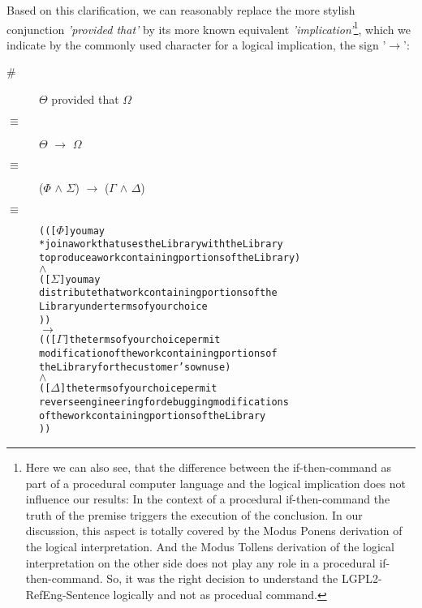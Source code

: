Based on this clarification, we can reasonably replace the more stylish
conjunction \emph{'provided that'} by its more known equivalent
\emph{'implication'}\footnote{Here we can also see, that the difference between
the if-then-command as part of a procedural computer language and the logical
implication does not influence our results: In the context of a procedural
if-then-command the truth of the premise triggers the execution of the
conclusion. In our discussion, this aspect is totally covered by the Modus
Ponens derivation of the logical interpretation. And the Modus Tollens
derivation of the logical interpretation on the other side does not play any
role in a procedural if-then-command. So, it was the right decision to
understand the LGPL2-RefEng-Sentence logically and not as procedual command.},
which we indicate by the commonly used character for a logical implication, the
sign '\emph{$\rightarrow$}':

\begin{description}
  \item[\#]  $\Theta$ provided that $\Omega$
  \item[$\equiv$] $\Theta$ $\rightarrow$ $\Omega$
  \item[$\equiv$] ($\Phi$ $\wedge$ $\Sigma$) $\rightarrow$ ($\Gamma$ $\wedge$
  $\Delta$)
  \item[$\equiv$]
\begin{alltt}   
  ( ( [\(\Phi\)] you may 
       *join a work that uses the Library with the Library
       to produce a work containing portions of the Library )
  \(\wedge\)
  ( [\(\Sigma\)] you may 
        distribute that work containing portions of the 
        Library under terms of your choice 
) )
\(\rightarrow\)
( ( [\(\Gamma\)] the terms of your choice permit 
        modification of the work containing portions of 
        the Library for the customer's own use )
  \(\wedge\)
  ( [\(\Delta\)] the terms of your choice permit
        reverse engineering for debugging modifications 
        of the work containing portions of the Library   
) )
\end{alltt}
\end{description}


